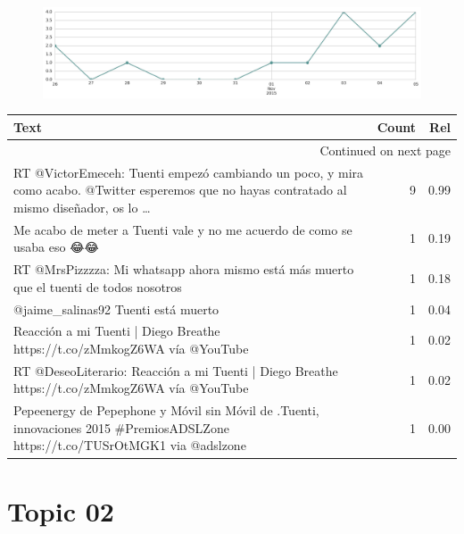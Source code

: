 \begin{figure}[htbp!]
    \centering
    \includegraphics[width=\textwidth]{twitter_murcia/report_images/topic-01-timeseries.jpg}
\end{figure}

\begin{longtable}{p{12.5cm}rr}
\toprule
Text & Count & Rel \\
\midrule
\endhead
\midrule
\multicolumn{3}{r}{{Continued on next page}} \\
\midrule
\endfoot

\bottomrule
\endlastfoot
RT @VictorEmeceh: Tuenti empezó cambiando un poco, y mira como acabo. @Twitter esperemos que no hayas contratado al mismo diseñador, os lo … & 9 & 0.99 \\
Me acabo de meter a Tuenti vale y no me acuerdo de como se usaba eso 😂😂 & 1 & 0.19 \\
RT @MrsPizzzza: Mi whatsapp ahora mismo está más muerto que el tuenti de todos nosotros & 1 & 0.18 \\
@jaime\_salinas92 Tuenti está muerto & 1 & 0.04 \\
Reacción a mi Tuenti | Diego Breathe https://t.co/zMmkogZ6WA vía @YouTube & 1 & 0.02 \\
RT @DeseoLiterario: Reacción a mi Tuenti | Diego Breathe https://t.co/zMmkogZ6WA vía @YouTube & 1 & 0.02 \\
Pepeenergy de Pepephone y Móvil sin Móvil de .Tuenti, innovaciones 2015 \#PremiosADSLZone https://t.co/TUSrOtMGK1 via @adslzone & 1 & 0.00 \\

\end{longtable}
\clearpage

\section{Topic 02}

